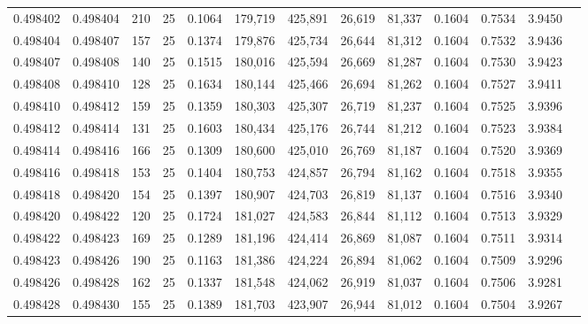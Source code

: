 \begin{tabular}{rrrrrrrrrrrrr}
0.498402 & 0.498404 & 210 &  25 &                                     0.1064 & 179,719 & 425,891 &  26,619 &  81,337 & 0.1604 & 0.7534 & 3.9450 \\
0.498404 & 0.498407 & 157 &  25 &                                     0.1374 & 179,876 & 425,734 &  26,644 &  81,312 & 0.1604 & 0.7532 & 3.9436 \\
0.498407 & 0.498408 & 140 &  25 &                                     0.1515 & 180,016 & 425,594 &  26,669 &  81,287 & 0.1604 & 0.7530 & 3.9423 \\
0.498408 & 0.498410 & 128 &  25 &                                     0.1634 & 180,144 & 425,466 &  26,694 &  81,262 & 0.1604 & 0.7527 & 3.9411 \\
0.498410 & 0.498412 & 159 &  25 &                                     0.1359 & 180,303 & 425,307 &  26,719 &  81,237 & 0.1604 & 0.7525 & 3.9396 \\
0.498412 & 0.498414 & 131 &  25 &                                     0.1603 & 180,434 & 425,176 &  26,744 &  81,212 & 0.1604 & 0.7523 & 3.9384 \\
0.498414 & 0.498416 & 166 &  25 &                                     0.1309 & 180,600 & 425,010 &  26,769 &  81,187 & 0.1604 & 0.7520 & 3.9369 \\
0.498416 & 0.498418 & 153 &  25 &                                     0.1404 & 180,753 & 424,857 &  26,794 &  81,162 & 0.1604 & 0.7518 & 3.9355 \\
0.498418 & 0.498420 & 154 &  25 &                                     0.1397 & 180,907 & 424,703 &  26,819 &  81,137 & 0.1604 & 0.7516 & 3.9340 \\
0.498420 & 0.498422 & 120 &  25 &                                     0.1724 & 181,027 & 424,583 &  26,844 &  81,112 & 0.1604 & 0.7513 & 3.9329 \\
0.498422 & 0.498423 & 169 &  25 &                                     0.1289 & 181,196 & 424,414 &  26,869 &  81,087 & 0.1604 & 0.7511 & 3.9314 \\
0.498423 & 0.498426 & 190 &  25 &                                     0.1163 & 181,386 & 424,224 &  26,894 &  81,062 & 0.1604 & 0.7509 & 3.9296 \\
0.498426 & 0.498428 & 162 &  25 &                                     0.1337 & 181,548 & 424,062 &  26,919 &  81,037 & 0.1604 & 0.7506 & 3.9281 \\
0.498428 & 0.498430 & 155 &  25 &                                     0.1389 & 181,703 & 423,907 &  26,944 &  81,012 & 0.1604 & 0.7504 & 3.9267 \\

\end{tabular}
